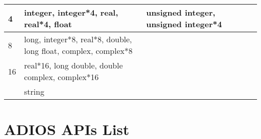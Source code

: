 {\begin{longtable}{llllll}
\hline
\multicolumn{1}{p{0.051in}|}{\begin{minipage}[t]{0.051in}\centering
{\small 4}\end{minipage}} & \multicolumn{1}{p{0.051in}|}{\begin{minipage}[t]{0.051in}\centering
{\small integer, integer*4, real, real*4, float}\end{minipage}} & \multicolumn{1}{p{0.051in}|}{\begin{minipage}[t]{0.051in}\raggedright
{\small unsigned integer, unsigned integer*4}\end{minipage}}\\
\hline
\multicolumn{1}{|p{0.287in}|}{\begin{minipage}[t]{0.287in}\centering
{\small 8}\end{minipage}} & \multicolumn{1}{p{2.534in}|}{\begin{minipage}[t]{2.534in}\centering
{\small long, integer*8, real*8, double, long float, complex, complex*8}\end{minipage}} & \multicolumn{4}{p{1.680in}|}{\begin{minipage}[t]{1.680in}\raggedright
\end{minipage}}\\
\hline
\multicolumn{1}{p{0.051in}|}{\begin{minipage}[t]{0.051in}\centering
{\small 16}\end{minipage}} & \multicolumn{1}{p{0.051in}|}{\begin{minipage}[t]{0.051in}\centering
{\small real*16, long double, double complex, complex*16}\end{minipage}} & \multicolumn{1}{p{0.051in}|}{\begin{minipage}[t]{0.051in}\centering
\end{minipage}}\\
\hline
\multicolumn{1}{|p{0.287in}|}{\begin{minipage}[t]{0.287in}\centering
\end{minipage}} & \multicolumn{1}{p{2.534in}|}{\begin{minipage}[t]{2.534in}\centering
{\small string}\end{minipage}} & \multicolumn{4}{p{1.680in}|}{\begin{minipage}[t]{1.680in}\raggedright
\end{minipage}}\\
\hline
\end{longtable}
}

\section{ADIOS APIs List}



